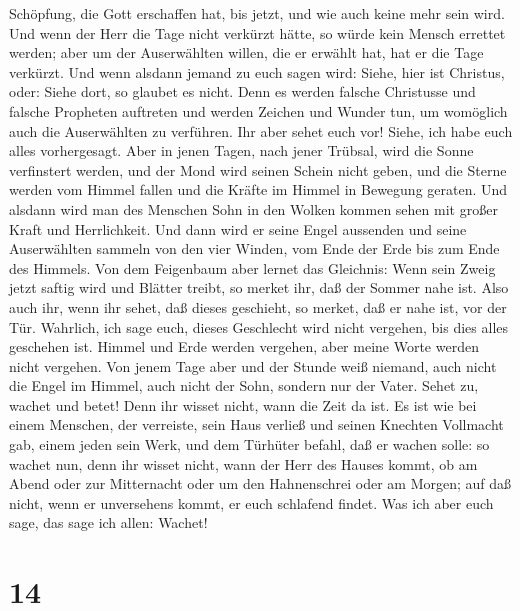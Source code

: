 Schöpfung, die Gott erschaffen hat, bis jetzt, und wie auch keine mehr
sein wird.  Und wenn der Herr die Tage nicht verkürzt
hätte, so würde kein Mensch errettet werden; aber um der Auserwählten
willen, die er erwählt hat, hat er die Tage verkürzt. 
Und wenn alsdann jemand zu euch sagen wird: Siehe, hier ist Christus,
oder: Siehe dort, so glaubet es nicht.  Denn es werden
falsche Christusse und falsche Propheten auftreten und werden Zeichen
und Wunder tun, um womöglich auch die Auserwählten zu verführen.
 Ihr aber sehet euch vor! Siehe, ich habe euch alles
vorhergesagt.  Aber in jenen Tagen, nach jener Trübsal,
wird die Sonne verfinstert werden, und der Mond wird seinen Schein nicht
geben,  und die Sterne werden vom Himmel fallen und die
Kräfte im Himmel in Bewegung geraten.  Und alsdann wird
man des Menschen Sohn in den Wolken kommen sehen mit großer Kraft und
Herrlichkeit.  Und dann wird er seine Engel aussenden und
seine Auserwählten sammeln von den vier Winden, vom Ende der Erde bis
zum Ende des Himmels.  Von dem Feigenbaum aber lernet das
Gleichnis: Wenn sein Zweig jetzt saftig wird und Blätter treibt, so
merket ihr, daß der Sommer nahe ist.  Also auch ihr, wenn
ihr sehet, daß dieses geschieht, so merket, daß er nahe ist, vor der
Tür.  Wahrlich, ich sage euch, dieses Geschlecht wird
nicht vergehen, bis dies alles geschehen ist.  Himmel und
Erde werden vergehen, aber meine Worte werden nicht vergehen.
 Von jenem Tage aber und der Stunde weiß niemand, auch
nicht die Engel im Himmel, auch nicht der Sohn, sondern nur der Vater.
 Sehet zu, wachet und betet! Denn ihr wisset nicht, wann
die Zeit da ist.  Es ist wie bei einem Menschen, der
verreiste, sein Haus verließ und seinen Knechten Vollmacht gab, einem
jeden sein Werk, und dem Türhüter befahl, daß er wachen solle:
 so wachet nun, denn ihr wisset nicht, wann der Herr des
Hauses kommt, ob am Abend oder zur Mitternacht oder um den Hahnenschrei
oder am Morgen;  auf daß nicht, wenn er unversehens
kommt, er euch schlafend findet.  Was ich aber euch sage,
das sage ich allen: Wachet!

\hypertarget{section-13}{%
\section{14}\label{section-13}}

